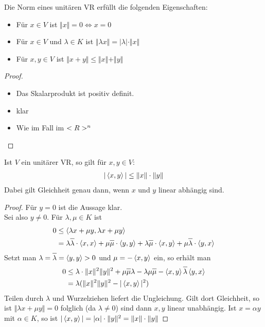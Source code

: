 \begin{proposition}
	Die Norm eines unitären VR erfüllt die folgenden Eigenschaften:
	\begin{itemize}
		\item Für $x\in V$ ist $\Vert x\Vert =0\iff x=0$
		\item Für $x\in V$ und $\lambda\in K$ ist $\Vert \lambda x\Vert=\vert \lambda\vert \cdot \Vert x\Vert$
		\item Für $x,y\in V$ ist $\Vert x+y\Vert \le \Vert x\Vert + \Vert y \Vert$
	\end{itemize}
\end{proposition}
\begin{proof}
	\begin{itemize}
		\item Das Skalarprodukt ist positiv definit.
		\item klar
		\item Wie im Fall im $<R>^n$
	\end{itemize}
\end{proof}

\begin{proposition}
	Ist $V$ ein unitärer VR, so gilt für $x,y\in V$:
	\begin{align}
		\vert \left\langle x,y\right\rangle\vert \le \Vert x\Vert\cdot \Vert y\Vert\notag
	\end{align}
	Dabei gilt Gleichheit genau dann, wenn $x$ und $y$ linear abhängig sind.
\end{proposition}
\begin{proof}
	Für $y=0$ ist die Aussage klar. \\
	Sei also $y\neq 0$. Für $\lambda,\mu\in K$ ist 
	\begin{align}
		0&\le \skalar{\lambda x+\mu y}{\lambda x+\mu y}\notag \\
		&= \lambda\overline{\lambda}\cdot \skalar{x}{x}+\mu\overline{\mu}\cdot \skalar{y}{y}+\lambda\overline{\mu}\cdot \skalar{x}{y}+\mu\overline{\lambda}\cdot\skalar{y}{x}\notag
	\end{align}
	Setzt man $\lambda=\overline{\lambda}=\skalar{y}{y}>0$ und $\mu=-\left\langle x,y\right\rangle$ ein, so erhält man 
	\begin{align}
		0&\le \lambda\cdot\Vert x\Vert^2\Vert y\Vert^2 +\mu\overline{\mu}\lambda -\lambda\mu\overline{\mu}-\skalar{x}{y}\overline{\lambda}\skalar{y}{x}\notag \\
		&= \lambda(\Vert x\Vert^2\Vert y\Vert^2-\vert\skalar{x}{y}\vert^2)\notag
	\end{align}
	Teilen durch $\lambda$ und Wurzelziehen liefert die Ungleichung. Gilt dort Gleichheit, so ist $\Vert \lambda x+\mu y\Vert=0$ folglich (da $\lambda\neq 0$) sind dann $x,y$ linear unabhängig. Ist $x=\alpha y$ mit $\alpha\in K$, so ist $\vert\left\langle x,y\right\rangle\vert =\vert \alpha\vert \cdot \Vert y\Vert^2=\Vert x\Vert \cdot\Vert y\Vert$
\end{proof}